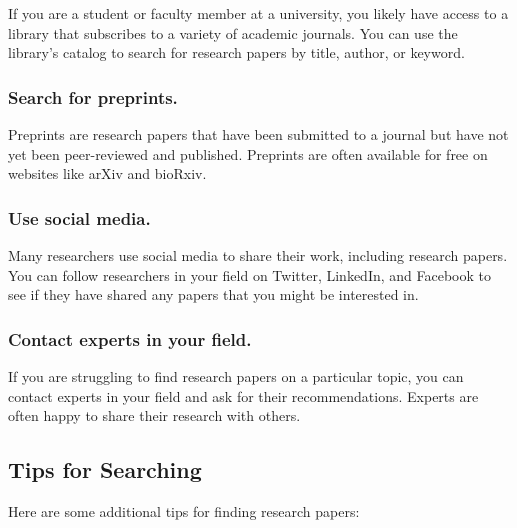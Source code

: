 \documentclass[
  b5paper]{book}
\begin{document}
If you are a student or faculty member at a university, you likely have access to a library that subscribes to a variety of academic journals. You can use the library's catalog to search for research papers by title, author, or keyword.

\hypertarget{search-for-preprints.}{%
\subsubsection*{Search for preprints.}\label{search-for-preprints.}}

Preprints are research papers that have been submitted to a journal but have not yet been peer-reviewed and published. Preprints are often available for free on websites like arXiv and bioRxiv.

\hypertarget{use-social-media.}{%
\subsubsection*{Use social media.}\label{use-social-media.}}

Many researchers use social media to share their work, including research papers. You can follow researchers in your field on Twitter, LinkedIn, and Facebook to see if they have shared any papers that you might be interested in.

\hypertarget{contact-experts-in-your-field.}{%
\subsubsection*{Contact experts in your field.}\label{contact-experts-in-your-field.}}

If you are struggling to find research papers on a particular topic, you can contact experts in your field and ask for their recommendations. Experts are often happy to share their research with others.

\hypertarget{tips-for-searching}{%
\subsection*{Tips for Searching}\label{tips-for-searching}}

Here are some additional tips for finding research papers:
\end{document}
